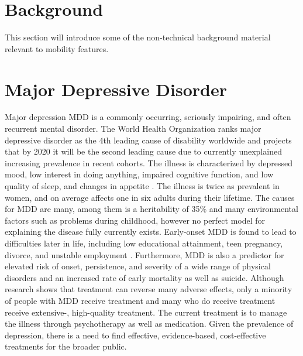 \section{Background}






This section will introduce some of the non-technical background material relevant to mobility features.

\section{Major Depressive Disorder}
Major depression MDD is a commonly occurring, seriously impairing, and often recurrent mental disorder. The World Health Organization ranks major depressive disorder as the 4th leading cause of disability worldwide \cite{murray1996} and projects that by 2020 it will be the second leading cause due to currently unexplained increasing prevalence in recent cohorts. The illness is characterized by depressed mood, low interest in doing anything, impaired cognitive function, and low quality of sleep, and changes in appetite \cite{mdd}. The illness is twice as prevalent in women, and on average affects one in six adults during their lifetime. The causes for MDD are many, among them is a heritability of 35\% and many environmental factors such as problems during childhood, however no perfect model for explaining the disease fully currently exists. Early-onset MDD is found to lead to difficulties later in life, including low educational attainment, teen pregnancy, divorce, and unstable employment \cite{costs_of_depression}. Furthermore, MDD is also a predictor for elevated risk of onset, persistence, and severity of a wide range of physical disorders and an increased rate of early mortality as well as suicide. Although research shows that treatment can reverse many adverse effects, only a minority of people with MDD receive treatment and many who do receive treatment receive extensive-, high-quality treatment. The current treatment is to manage the illness through psychotherapy as well as medication. Given the prevalence of depression, there is a need to find effective, evidence-based, cost-effective treatments for the broader public. 


